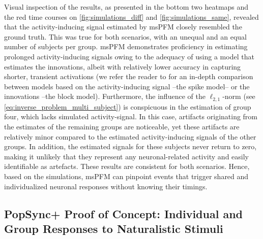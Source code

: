 Visual inspection of the results, as presented in the bottom two heatmaps and
the red time courses on \cref{fig:simulations_diff} and
\cref{fig:simulations_same}, revealed that the activity-inducing signal
estimated by msPFM closely resembled the ground truth. This was true for both
scenarios, with an unequal and an equal number of subjects per group. msPFM
demonstrates proficiency in estimating prolonged activity-inducing signals owing
to the adequacy of using a model that estimates the innovations, albeit with
relatively lower accuracy in capturing shorter, transient activations (we refer
the reader to \cite{Urunuela2023HemodynamicDeconvolutionDemystified} for an
in-depth comparison between models based on the activity-inducing signal --the
spike model-- or the innovations --the block model). Furthermore, the influence
of the $\ell_{2,1}$-norm (see \cref{eq:inverse_problem_multi_subject}) is
conspicuous in the estimation of group four, which lacks simulated
activity-signal. In this case, artifacts originating from the estimates of the
remaining groups are noticeable, yet these artifacts are relatively minor
compared to the estimated activity-inducing signals of the other groups. In
addition, the estimated signals for these subjects never return to zero, making
it unlikely that they represent any neuronal-related activity and easily
identifiable as artefacts. These results are consistent for both scenarios.
Hence, based on the simulations, msPFM can pinpoint events that trigger shared
and individualized neuronal responses without knowing their timings.

\subsection{PopSync+ Proof of Concept: Individual and Group Responses to Naturalistic Stimuli}

